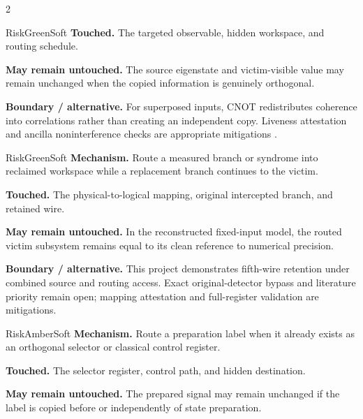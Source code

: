 \begin{multicols}{2}
\begin{matrixrecord}{RiskGreenSoft}
\textbf{Touched.} The targeted observable, hidden workspace, and routing schedule.

\textbf{May remain untouched.} The source eigenstate and victim-visible value may remain unchanged when the copied information is genuinely orthogonal.

\textbf{Boundary / alternative.} For superposed inputs, CNOT redistributes coherence into correlations rather than creating an independent copy. Liveness attestation and ancilla noninterference checks are appropriate mitigations \cite{nielsen2010quantum,decross2023reuse}.

\hfill\matrixback
\end{matrixrecord}

\hypertarget{cell:B2}{}
\begin{matrixrecord}{RiskGreenSoft}
\textbf{Mechanism.} Route a measured branch or syndrome into reclaimed workspace while a replacement branch continues to the victim.

\textbf{Touched.} The physical-to-logical mapping, original intercepted branch, and retained wire.

\textbf{May remain untouched.} In the reconstructed fixed-input model, the routed victim subsystem remains equal to its clean reference to numerical precision.

\textbf{Boundary / alternative.} This project demonstrates fifth-wire retention under combined source and routing access. Exact original-detector bypass and literature priority remain open; mapping attestation and full-register validation are mitigations.

\hfill\matrixback
\end{matrixrecord}

\hypertarget{cell:B3}{}
\begin{matrixrecord}{RiskAmberSoft}
\textbf{Mechanism.} Route a preparation label when it already exists as an orthogonal selector or classical control register.

\textbf{Touched.} The selector register, control path, and hidden destination.

\textbf{May remain untouched.} The prepared signal may remain unchanged if the label is copied before or independently of state preparation.


\end{matrixrecord}
\end{multicols}
